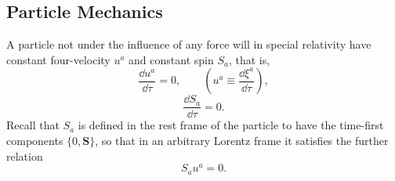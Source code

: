 
\subsection{Particle Mechanics}\label{sec:5.1}

A particle not under the influence of any force will in special relativity
have constant four-velocity \(u^a\) and constant spin \(S_a\), that is,
\begin{equation}
  \frac{\dd u^a}{\dd\tau}=0,
  \qquad
  \left(
    u^a\equiv\frac{\dd\xi^a}{\dd\tau}
  \right),
  \tag{5.1.1}\label{eq:5.1.1}
\end{equation}
\begin{equation}
  \frac{\dd S_a}{\dd\tau}=0.
  \tag{5.1.2}\label{eq:5.1.2}
\end{equation}
Recall that \(S_a\) is defined in the rest frame of the particle to have the
time-first components \(\{0,\mathbf S\}\), so that in an arbitrary Lorentz
frame it satisfies the further relation
\begin{equation}
  S_a u^a=0.
  \tag{5.1.3}\label{eq:5.1.3}
\end{equation}

